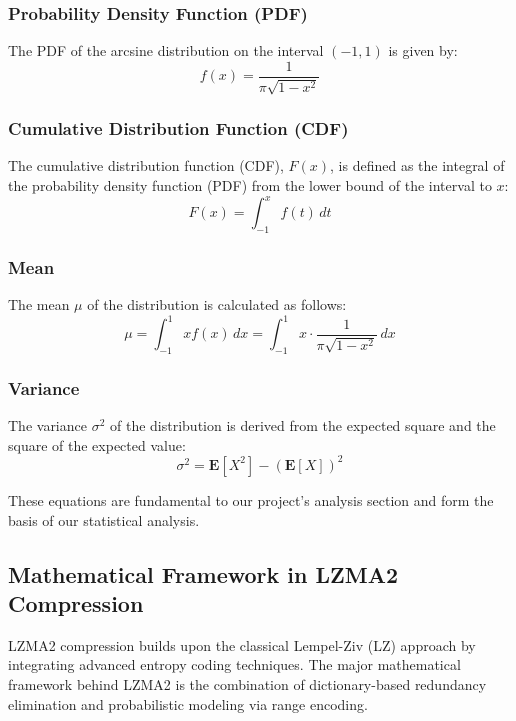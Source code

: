 \subsubsection{Probability Density Function (PDF)}
The PDF of the arcsine distribution on the interval \((-1, 1)\) is given by:
\begin{equation}
f(x) = \frac{1}{\pi \sqrt{1-x^2}}
\end{equation}

\subsubsection{Cumulative Distribution Function (CDF)}
The cumulative distribution function (CDF), \( F(x) \), is defined as the integral of the probability density function (PDF) from the lower bound of the interval to \( x \):
\begin{equation}
F(x) = \int_{-1}^{x} f(t) \, dt
\end{equation}

\subsubsection{Mean}
The mean \(\mu\) of the distribution is calculated as follows:
\begin{equation}
\mu = \int_{-1}^{1} x f(x) \, dx = \int_{-1}^{1} x \cdot \frac{1}{\pi \sqrt{1-x^2}} \, dx
\end{equation}

\subsubsection{Variance}
The variance \(\sigma^2\) of the distribution is derived from the expected square and the square of the expected value:
\begin{equation}
\sigma^2 = \mathbf{E}[X^2] - (\mathbf{E}[X])^2
\end{equation}

These equations are fundamental to our project's analysis section and form the basis of our statistical analysis.

\subsection{Mathematical Framework in LZMA2 Compression}
LZMA2 compression builds upon the classical Lempel-Ziv (LZ) approach by integrating advanced entropy coding techniques. The major mathematical framework behind LZMA2 is the combination of dictionary-based redundancy elimination and probabilistic modeling via range encoding.

